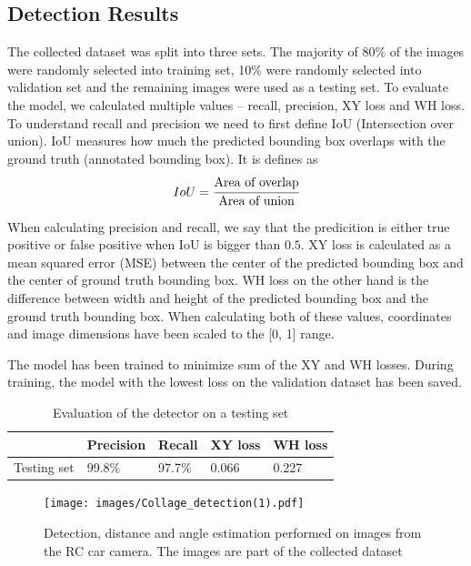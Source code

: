 \subsection{Detection Results}
The collected dataset was split into three sets. The majority of 80\% of the images were randomly selected into training set, 10\% were randomly selected into validation set and the remaining images were used as a testing set. To evaluate the model, we calculated multiple values -- recall, precision, XY loss and WH loss. To understand recall and precision we need to first define IoU (Intersection over union). IoU measures how much the predicted bounding box overlaps with the ground truth (annotated bounding box). It is defines as 
\begin{equation}IoU = \cfrac{\textrm{Area of overlap}}{\textrm{Area of union}}\end{equation}

When calculating precision and recall, we say that the predicition is either true positive or false positive when IoU is bigger than $0.5$. XY loss is calculated as a mean squared error (MSE) between the center of the predicted bounding box and the center of ground truth bounding box. WH loss on the other hand is the difference between width and height of the predicted bounding box and the ground truth bounding box. When calculating both of these values, coordinates and image dimensions have been scaled to the [0, 1] range. \par
The model has been trained to minimize sum of the XY and WH losses. During training, the model with the lowest loss on the validation dataset has been saved.

\begin{table}[]
\begin{tabular}{l|llll}
\hline
            & Precision & Recall & XY loss & WH loss \\ \hline
Testing set & 99.8\%    & 97.7\% & 0.066   & 0.227   \\ \hline
\end{tabular}
\label{tab:detection}
\caption{Evaluation of the detector on a testing set}
\end{table}



\begin{figure}[h!]
    \centering
    \texttt{[image: images/Collage\_detection(1).pdf]}
    
    \caption{Detection, distance and angle estimation performed on images from the RC car camera. The images are part of the collected dataset}\label{f:detection_images}
\end{figure}

